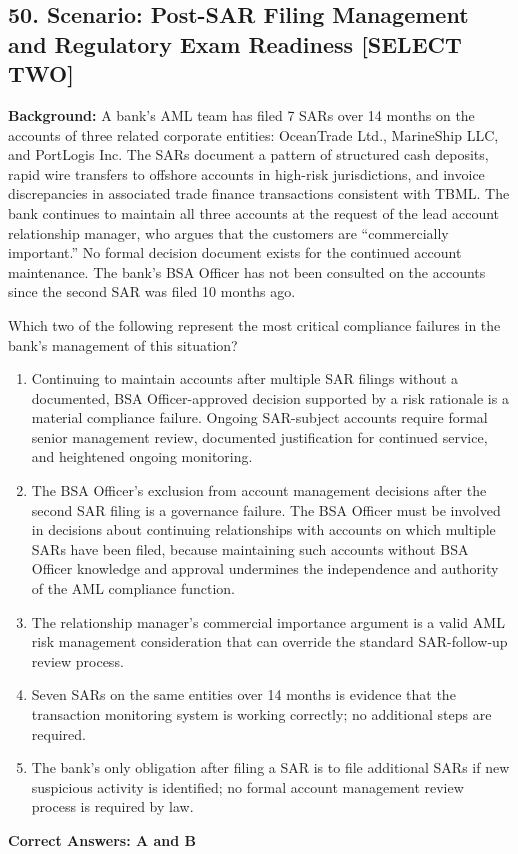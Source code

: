\documentclass[11pt,a4paper]{article}
\begin{document}
	\subsection{50. Scenario: Post-SAR Filing Management and Regulatory Exam Readiness \textnormal{[SELECT TWO]}}
	
	\textbf{Background:} A bank's AML team has filed 7 SARs over 14 months on the accounts of three related corporate entities: OceanTrade Ltd., MarineShip LLC, and PortLogis Inc. The SARs document a pattern of structured cash deposits, rapid wire transfers to offshore accounts in high-risk jurisdictions, and invoice discrepancies in associated trade finance transactions consistent with TBML. The bank continues to maintain all three accounts at the request of the lead account relationship manager, who argues that the customers are ``commercially important.'' No formal decision document exists for the continued account maintenance. The bank's BSA Officer has not been consulted on the accounts since the second SAR was filed 10 months ago.
	
	Which two of the following represent the most critical compliance failures in the bank's management of this situation?
	
	\begin{enumerate}[label=\Alph*.]
		\item Continuing to maintain accounts after multiple SAR filings without a documented, BSA Officer-approved decision supported by a risk rationale is a material compliance failure. Ongoing SAR-subject accounts require formal senior management review, documented justification for continued service, and heightened ongoing monitoring.
		\item The BSA Officer's exclusion from account management decisions after the second SAR filing is a governance failure. The BSA Officer must be involved in decisions about continuing relationships with accounts on which multiple SARs have been filed, because maintaining such accounts without BSA Officer knowledge and approval undermines the independence and authority of the AML compliance function.
		\item The relationship manager's commercial importance argument is a valid AML risk management consideration that can override the standard SAR-follow-up review process.
		\item Seven SARs on the same entities over 14 months is evidence that the transaction monitoring system is working correctly; no additional steps are required.
		\item The bank's only obligation after filing a SAR is to file additional SARs if new suspicious activity is identified; no formal account management review process is required by law.
	\end{enumerate}
	\textbf{Correct Answers: A and B}
	
\end{document}
